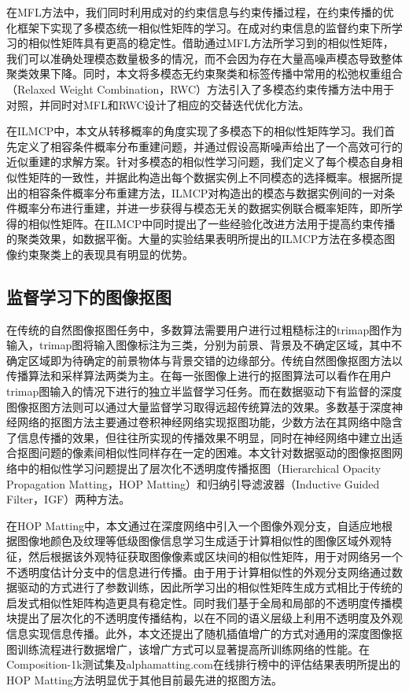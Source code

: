 在MFL方法中，我们同时利用成对的约束信息与约束传播过程，在约束传播的优化框架下实现了多模态统一相似性矩阵的学习。在成对约束信息的监督约束下所学习的相似性矩阵具有更高的稳定性。借助通过MFL方法所学习到的相似性矩阵，我们可以准确处理模态数量极多的情况，而不会因为存在大量高噪声模态导致整体聚类效果下降。同时，本文将多模态无约束聚类和标签传播中常用的松弛权重组合（Relaxed Weight Combination，RWC）方法引入了多模态约束传播方法中用于对照，并同时对MFL和RWC设计了相应的交替迭代优化方法。

在ILMCP中，本文从转移概率的角度实现了多模态下的相似性矩阵学习。我们首先定义了相容条件概率分布重建问题，并通过假设高斯噪声给出了一个高效可行的近似重建的求解方案。针对多模态的相似性学习问题，我们定义了每个模态自身相似性矩阵的一致性，并据此构造出每个数据实例上不同模态的选择概率。根据所提出的相容条件概率分布重建方法，ILMCP对构造出的模态与数据实例间的一对条件概率分布进行重建，并进一步获得与模态无关的数据实例联合概率矩阵，即所学得的相似性矩阵。在ILMCP中同时提出了一些经验化改进方法用于提高约束传播的聚类效果，如数据平衡。大量的实验结果表明所提出的ILMCP方法在多模态图像约束聚类上的表现具有明显的优势。

\subsection{监督学习下的图像抠图}
在传统的自然图像抠图任务中，多数算法需要用户进行过粗糙标注的trimap图作为输入，trimap图将输入图像标注为三类，分别为前景、背景及不确定区域，其中不确定区域即为待确定的前景物体与背景交错的边缘部分。传统自然图像抠图方法以传播算法和采样算法两类为主。在每一张图像上进行的抠图算法可以看作在用户trimap图输入的情况下进行的独立半监督学习任务。而在数据驱动下有监督的深度图像抠图方法则可以通过大量监督学习取得远超传统算法的效果。多数基于深度神经网络的抠图方法主要通过卷积神经网络实现抠图功能，少数方法在其网络中隐含了信息传播的效果\cite{samplenet,cai2019disentangled}，但往往所实现的传播效果不明显，同时在神经网络中建立出适合抠图问题的像素间相似性同样存在一定的困难。本文针对数据驱动的图像抠图网络中的相似性学习问题提出了层次化不透明度传播抠图（Hierarchical Opacity Propagation Matting，HOP Matting）和归纳引导滤波器（Inductive Guided Filter，IGF）两种方法。

在HOP Matting中，本文通过在深度网络中引入一个图像外观分支，自适应地根据图像地颜色及纹理等低级图像信息学习生成适于计算相似性的图像区域外观特征，然后根据该外观特征获取图像像素或区块间的相似性矩阵，用于对网络另一个不透明度估计分支中的信息进行传播。由于用于计算相似性的外观分支网络通过数据驱动的方式进行了参数训练，因此所学习出的相似性矩阵生成方式相比于传统的启发式相似性矩阵构造更具有稳定性。同时我们基于全局和局部的不透明度传播模块提出了层次化的不透明度传播结构，以在不同的语义层级上利用不透明度及外观信息实现信息传播。此外，本文还提出了随机插值增广的方式对通用的深度图像抠图训练流程进行数据增广，该增广方式可以显著提高所训练网络的性能。在Composition-1k测试集\cite{xu2017deep}及alphamatting.com在线排行榜\cite{rhemann2009perceptually}中的评估结果表明所提出的HOP Matting方法明显优于其他目前最先进的抠图方法。

